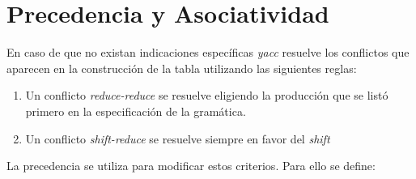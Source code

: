 \section{Precedencia y Asociatividad}
\label{section:precandascoyacc}
En caso de que no existan indicaciones específicas \emph{yacc} resuelve
los conflictos que aparecen en la construcción de la tabla utilizando las siguientes reglas:
\begin{enumerate}
\item
Un conflicto \emph{reduce-reduce} se resuelve eligiendo la producción que se listó primero en la especificación de la gramática.
\item
Un conflicto \emph{shift-reduce} se resuelve siempre en favor del \emph{shift}
\end{enumerate}
La precedencia se utiliza para modificar estos criterios. Para 
ello se define:

